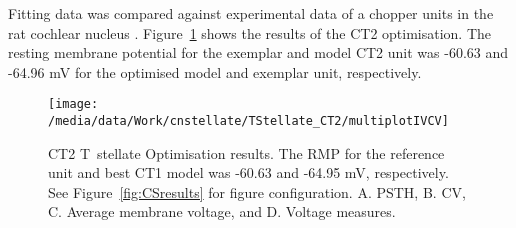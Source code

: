 

Fitting data was compared against experimental data of a chopper units in the rat cochlear nucleus \citep{PaoliniClareyEtAl:2005}.
Figure~\ref{fig:CT2results} shows the results of the CT2 optimisation.
The resting membrane potential for the exemplar and model CT2 unit was -60.63 and -64.96 mV for the optimised model and exemplar unit, respectively.


\begin{figure}[htb]
 \centering
\texttt{[image: /media/data/Work/cnstellate/TStellate\_CT2/multiplotIVCV]}
  \caption[CT2 T~stellate Optimisation results]{CT2 T~stellate Optimisation results.
The RMP for the reference unit and best CT1 model was -60.63 and -64.95 mV, respectively.
See Figure~\ref{fig:CSresults} for figure configuration.
A. PSTH, B. CV, C. Average membrane voltage, and D. Voltage measures.}
  \label{fig:CT2results}
\end{figure}



